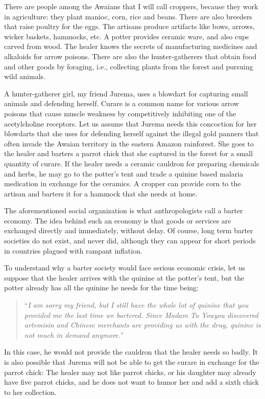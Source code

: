 \documentclass[
  12pt,
]{book}
\begin{document}
There are people among the Awaians that I will call croppers, because
they work in agriculture: they plant manioc, corn, rice and beans. There
are also breeders that raise poultry for the eggs. The artisans produce
artifacts like bows, arrows, wicker baskets, hammocks, etc. A potter
provides ceramic ware, and also cups carved from wood. The healer knows
the secrets of manufacturing medicines and alkaloids for arrow poisons.
There are also the hunter-gatherers that obtain food and other goods by
foraging, i.e., collecting plants from the forest and pursuing wild
animals.

A hunter-gatherer girl, my friend Jurema, uses a blowdart for capturing
small animals and defending herself. Curare is a common name for various
arrow poisons that cause muscle weakness by competitively inhibiting one
of the acetylcholine receptors. Let us assume that Jurema needs this
concoction for her blowdarts that she uses for defending herself against
the illegal gold panners that often invade the Awaian territory in the
eastern Amazon rainforest. She goes to the healer and barters a parrot
chick that she captured in the forest for a small quantity of curare. If
the healer needs a ceramic cauldron for preparing chemicals and herbs,
he may go to the potter's tent and trade a quinine based malaria
medication in exchange for the ceramics. A cropper can provide corn to
the artisan and barters it for a hammock that she needs at home.

The aforementioned social organization is what anthropologists call a
barter economy. The idea behind such an economy is that goods or
services are exchanged directly and immediately, without delay. Of
course, long term barter societies do not exist, and never did, although
they can appear for short periods in countries plagued with rampant
inflation.

To understand why a barter society would face serious economic crisis,
let us suppose that the healer arrives with the quinine at the potter's
tent, but the potter already has all the quinine he needs for the time
being:

\begin{quote}
``\emph{I am sorry my friend, but I still have the whole lot of quinine
that you provided me the last time we bartered. Since Madam Tu Youyou
discovered artemisin and Chinese merchants are providing us with the
drug, quinine is not much in demand anymore.}''
\end{quote}

In this case, he would not provide the cauldron that the healer needs so
badly. It is also possible that Jurema will not be able to get the
curare in exchange for the parrot chick: The healer may not like parrot
chicks, or his daughter may already have five parrot chicks, and he does
not want to humor her and add a sixth chick to her collection.
\end{document}
